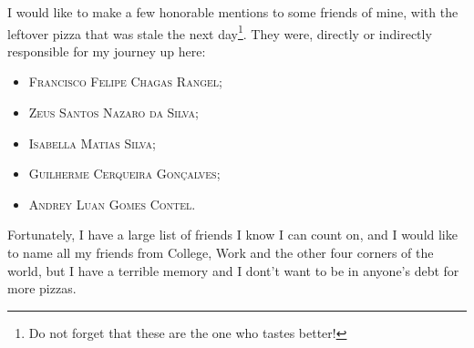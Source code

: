 I would like to make a few honorable mentions to some friends of mine, with the leftover pizza that was stale the next day\footnote{Do not forget that these are the one who tastes better!}. They were, directly or indirectly responsible for my journey up here: 
	\begin{itemize}
		\item \textsc{Francisco Felipe Chagas Rangel};
		\item \textsc{Zeus Santos Nazaro da Silva};\item \textsc{Isabella Matias Silva};
		\item \textsc{Guilherme Cerqueira Gonçalves}; \item \textsc{Andrey Luan Gomes Contel}.
	\end{itemize}
\thispagestyle{empty}
Fortunately, I have a large list of friends I know I can count on, and I would like to name all my friends from College, Work and the other four corners of the world, but I have a terrible memory and I dont't want to be in anyone's debt for more pizzas.

